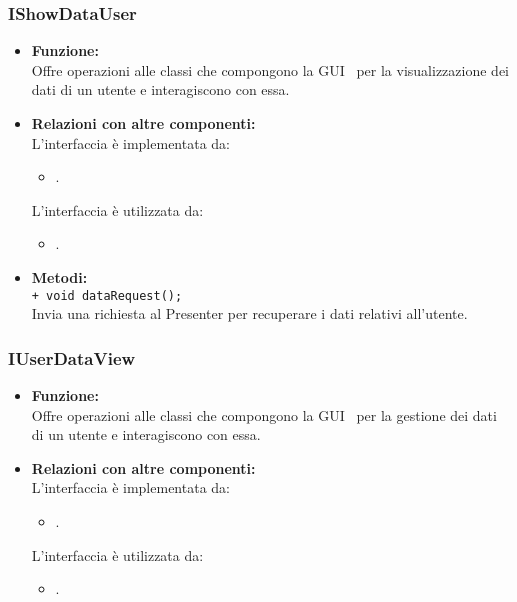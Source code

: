 {\begin{sloppypar}
{		
		\subsubsection{IShowDataUser}\label{ssub:IShowDataUser}{
		\begin{itemize}
			\item[] \textbf{Funzione:}\\
				  Offre operazioni alle classi che compongono la GUI\g~ per la visualizzazione dei dati di un utente e interagiscono con essa.\\
				
			\item[] \textbf{Relazioni con altre componenti:}\\
				L'interfaccia è implementata da:
				\begin{itemize}
					\item[] .
				\end{itemize}
				L'interfaccia è utilizzata da:
				\begin{itemize}
					\item[] .\\
				\end{itemize}
				
			\item[] \textbf{Metodi:}\\
				\texttt{+ void dataRequest();}\\
				Invia una richiesta al Presenter per recuperare i dati relativi all'utente.\\
		\end{itemize}
		}
		
		\subsubsection{IUserDataView}\label{ssub:IUserDataView}{
		\begin{itemize}
			\item[] \textbf{Funzione:}\\
				  Offre operazioni alle classi che compongono la GUI\g~ per la gestione dei dati di un utente e interagiscono con essa.\\
				
			\item[] \textbf{Relazioni con altre componenti:}\\
				L'interfaccia è implementata da:
				\begin{itemize}
					\item[] .
				\end{itemize}
				L'interfaccia è utilizzata da:
				\begin{itemize}
					\item[] .\\
				\end{itemize}
				

\end{itemize}}}
\end{sloppypar}}
